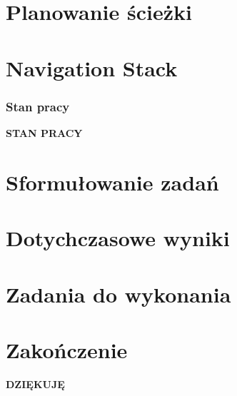 \documentclass[aspectratio=169,11pt]{beamer}
\let\oldheadcommand\headcommand
\newcommand{\resumenavigation}{\addtocontents{nav}{\string\let\string\headcommand\string\oldheadcommand}}
\begin{document}
\section{Planowanie ścieżki}


\section{Navigation Stack}


{
\begin{frame}
\frametitle{Stan pracy}
	\begin{center}
		\LARGE{\textbf{STAN PRACY}}
	\end{center}
\end{frame}
}

\section{Sformułowanie zadań}


\section{Dotychczasowe wyniki}


\section{Zadania do wykonania}


\section{Zakończenie}
\begin{frame}
	\begin{center}
	\LARGE{\textbf{DZIĘKUJĘ}}
	\end{center}
\end{frame}


\end{document}

